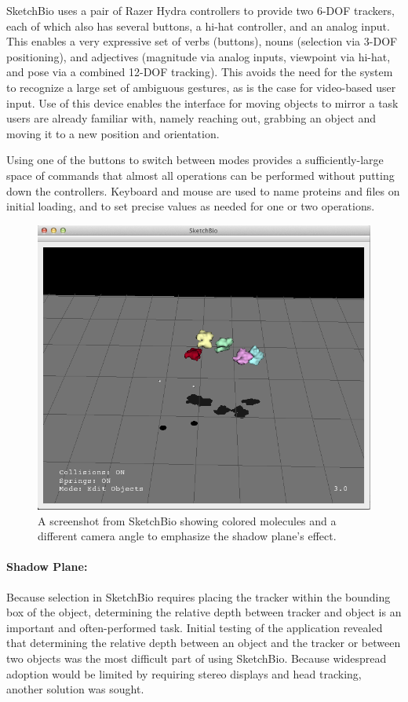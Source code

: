 \documentclass[twocolumn]{bmcart}%
\begin{document}
SketchBio uses a pair of Razer Hydra controllers to provide two 6-DOF trackers, each of which also has several buttons, a hi-hat controller, and an analog input.
This enables a very expressive set of verbs (buttons), nouns (selection via 3-DOF positioning), and adjectives (magnitude via analog inputs, viewpoint via hi-hat, and pose via a combined 12-DOF tracking).
This avoids the need for the system to recognize a large set of ambiguous gestures, as is the case for video-based user input.
Use of this device enables the interface for moving objects to mirror a task users are already familiar with, namely reaching out, grabbing an object and moving it to a new position and orientation.

Using one of the buttons to switch between modes provides a sufficiently-large space of commands that almost all operations can be performed without putting down the controllers.
Keyboard and mouse are used to name proteins and files on initial loading, and to set precise values as needed for one or two operations.

\begin{figure}[h]
\centering
\includegraphics[width=0.9\columnwidth]{shadow_plane.png}
\caption{A screenshot from SketchBio showing colored molecules and a different camera angle to emphasize the shadow plane's effect.}
\label{fig:shadow_plane}
\end{figure}

\paragraph*{Shadow Plane:}
Because selection in SketchBio requires placing the tracker within the bounding box of the object, determining the relative depth between tracker and object is an important and often-performed task.
Initial testing of the application revealed that determining the relative depth between an object and the tracker or between two objects was the most difficult part of using SketchBio.
Because widespread adoption would be limited by requiring stereo displays and head tracking, another solution was sought.
\end{document}
